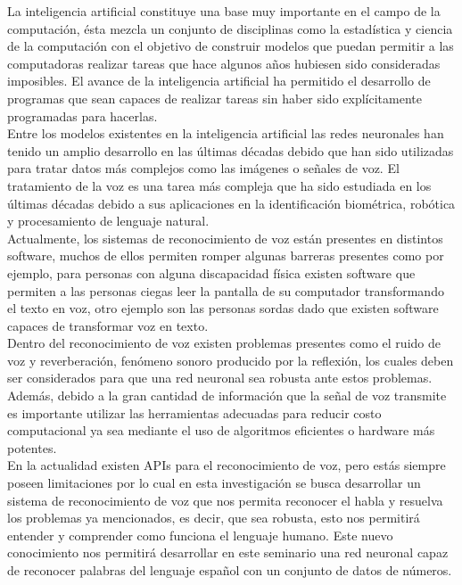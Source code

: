 La inteligencia artificial constituye una base muy importante en el campo de la computación, ésta mezcla un conjunto de disciplinas como la estadística y ciencia de la computación con el objetivo de construir modelos que puedan permitir a las computadoras realizar tareas que hace algunos años hubiesen sido consideradas imposibles. El avance de la inteligencia artificial ha permitido el desarrollo de programas que sean capaces de realizar tareas sin haber sido explícitamente programadas para hacerlas.\\
Entre los modelos existentes en la inteligencia artificial las redes neuronales han tenido un amplio desarrollo en las últimas décadas debido que han sido utilizadas para tratar datos más complejos como las imágenes o señales de voz. El tratamiento de la voz es una tarea más compleja que ha sido estudiada en los últimas décadas debido a sus aplicaciones en la identificación biométrica, robótica y procesamiento de lenguaje natural.\\
Actualmente, los sistemas de reconocimiento de voz están presentes en distintos software, muchos de ellos permiten romper algunas barreras presentes como por ejemplo, para personas con alguna discapacidad física existen software que permiten a las personas ciegas leer la pantalla de su computador transformando el texto en voz, otro ejemplo son las personas sordas dado que existen software capaces de transformar voz en texto.\\
Dentro del reconocimiento de voz existen problemas presentes como el ruido de voz y reverberación, fenómeno sonoro producido por la reflexión,  los cuales deben ser considerados para que una red neuronal sea robusta ante estos problemas.\\ Además, debido a la gran cantidad de información que la señal de voz transmite es importante utilizar las herramientas adecuadas para reducir costo computacional ya sea mediante el uso de algoritmos eficientes o hardware más potentes.\\
En la actualidad existen APIs para el reconocimiento de voz, pero estás siempre poseen limitaciones por lo cual en esta investigación se busca desarrollar un sistema de reconocimiento de voz que nos permita reconocer el habla y resuelva los problemas ya mencionados, es decir, que sea robusta, esto nos permitirá entender y comprender como funciona el lenguaje humano. Este nuevo conocimiento nos permitirá desarrollar en este seminario una red neuronal capaz de reconocer palabras del lenguaje español con un conjunto de datos de números.


